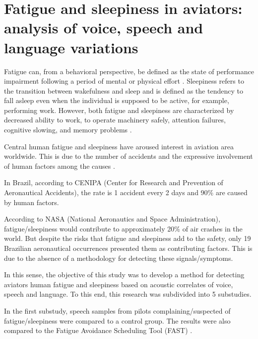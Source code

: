 \chapter{Fatigue and sleepiness in aviators: analysis of voice, speech and language variations}\label{ch:carlaaparecid31}
\begin{affils}
\end{affils}


Fatigue can, from a behavioral perspective, be defined as the state of
performance impairment following a period of mental or physical effort \citep{akerstedt1990,akerstedt2008,banks2013}.
Sleepiness refers to the transition between wakefulness and sleep and is
defined as the tendency to fall asleep even when the individual is supposed to
be active, for example, performing work. However, both fatigue and sleepiness
are characterized by decreased ability to work, to operate machinery safely,
attention failures, cognitive slowing, and memory problems \citep{akerstedt2008,lim2010}.

Central human fatigue and sleepiness have aroused interest in aviation area
worldwide. This is due to the number of accidents and the expressive
involvement of human factors among the causes \citep{banks2013,greeley2007,greeley2013,krajewski2007,krajewski2009,krajewski2010}.

In Brazil, according to CENIPA (Center for Research and Prevention of
Aeronautical Accidents), the rate is 1 accident every 2 days and 90\% are caused
by human factors.

According to NASA (National Aeronautics and Space Administration),
fatigue/sleepiness would contribute to approximately 20\% of air crashes in the
world. But despite the risks that fatigue and sleepiness add to the safety,
only 19 Brazilian aeronautical occurrences presented them as contributing
factors. This is due to the absence of a methodology for detecting these
signals/symptoms.

In this sense, the objective of this study was to develop a method for
detecting aviators human fatigue and sleepiness based on acoustic correlates of
voice, speech and language. To this end, this research was subdivided into 5
substudies.

In the first substudy, speech samples from pilots complaining/suspected of
fatigue/sleepiness were compared to a control group. The results were also
compared to the Fatigue Avoidance Scheduling Tool (FAST) \citep{fastfatigue}. 

